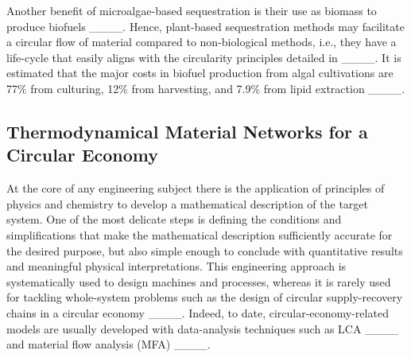 Another benefit of microalgae-based sequestration is their use as biomass to produce biofuels ____. Hence, plant-based sequestration methods may facilitate a circular flow of material compared to non-biological methods, i.e., they have a life-cycle that easily aligns with the circularity principles detailed in ____. It is estimated that the major costs in biofuel production from algal cultivations are 77\% from culturing, 12\% from harvesting, and 7.9\% from lipid extraction ____.   


 

     





\subsection{Thermodynamical Material Networks for a Circular Economy}
At the core of any engineering subject there is the application of principles of physics and chemistry to develop a mathematical description of the target system. One of the most delicate steps is defining the conditions and simplifications that make the mathematical description sufficiently accurate for the desired purpose, but also simple enough to conclude with quantitative results and meaningful physical interpretations. This engineering approach is systematically used to design machines and processes, whereas it is rarely used for tackling whole-system problems such as the design of circular supply-recovery chains in a circular economy ____. Indeed, to date, circular-economy-related models are usually developed with data-analysis techniques such as LCA ____ and material flow analysis (MFA) ____. 

